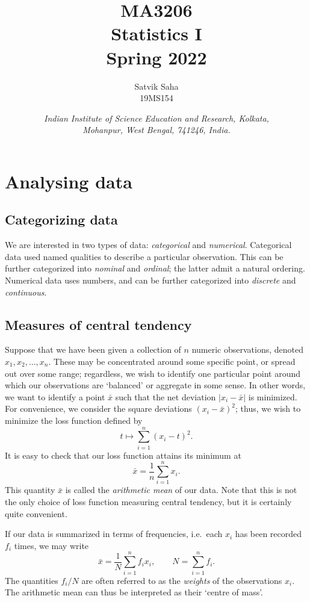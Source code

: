 \documentclass[11pt]{article}
\title{
    \Large\textsc{MA3206} \\
    \Huge \textbf{Statistics I} \\
    \vspace{5pt}
    \Large{Spring 2022}
}
\author{
    \large Satvik Saha
    \\\textsc{\small 19MS154}
}
\date{\normalsize
    \textit{Indian Institute of Science Education and Research, Kolkata, \\
    Mohanpur, West Bengal, 741246, India.} \\
}
\theoremstyle{definition}
\theoremstyle{remark}
\numberwithin{equation}{section}
\begin{document}
    \maketitle

    \tableofcontents

    \section{Analysing data}

    \subsection{Categorizing data}
    
    We are interested in two types of data: \emph{categorical} and \emph{numerical}.
    Categorical data used named qualities to describe a particular observation. This
    can be further categorized into \emph{nominal} and \emph{ordinal}; the latter
    admit a natural ordering. Numerical data uses numbers, and can be further
    categorized into \emph{discrete} and \emph{continuous}.
    
    \subsection{Measures of central tendency}
    
    Suppose that we have been given a collection of $n$ numeric observations, denoted
    $x_1, x_2, \dots, x_n$. These may be concentrated around some specific point, or
    spread out over some range; regardless, we wish to identify one particular point
    around which our observations are `balanced' or aggregate in some sense. In other
    words, we want to identify a point $\bar{x}$ such that the net deviation $|x_i -
    \bar{x}|$ is minimized. For convenience, we consider the square deviations $(x_i
    - \bar{x})^2$; thus, we wish to minimize the loss function defined by \[
        t \mapsto \sum_{i = 1}^n (x_i - t)^2.
    \] It is easy to check that our loss function attains its minimum at \[
        \bar{x} = \frac{1}{n}\sum_{i = 1}^n x_i.
    \] This quantity $\bar{x}$ is called the \emph{arithmetic mean} of our data.
    Note that this is not the only choice of loss function measuring central
    tendency, but it is certainly quite convenient.

    If our data is summarized in terms of frequencies, i.e.\ each $x_i$ has been
    recorded $f_i$ times, we may write \[
        \bar{x} = \frac{1}{N}\sum_{i = 1}^n f_ix_i, \qquad N = \sum_{i = 1}^n f_i.
    \] The quantities $f_i / N$ are often referred to as the \emph{weights} of the
    observations $x_i$. The arithmetic mean can thus be interpreted as their `centre
    of mass'. \\
\end{document}
